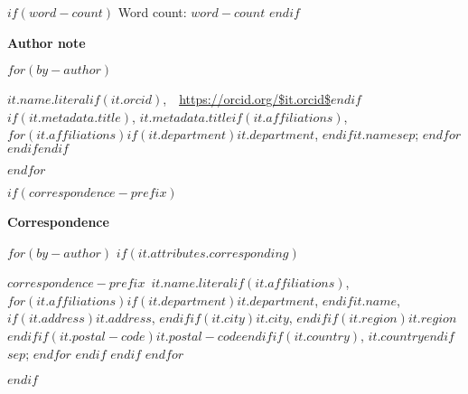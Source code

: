 
\begin{titlepage}
\center

{\let\newpage\relax\maketitle}

\thispagestyle{title}

\vspace{0.25in}

$if(word-count)$
{\center Word count: $word-count$}
$endif$

\vspace{0.5in}

\begin{center}

\textbf{Author note}

$for(by-author)$
\raggedright\setlength{\parindent}{0.5in}$it.name.literal$$if(it.orcid)$,~~\url{https://orcid.org/$it.orcid$}$endif$$if(it.metadata.title)$, $it.metadata.title$$if(it.affiliations)$, $for(it.affiliations)$$if(it.department)$$it.department$, $endif$$it.name$$sep$; $endfor$ $endif$$endif$

$endfor$

\end{center}

$if(correspondence-prefix)$
\begin{center}

\textbf{Correspondence}

$for(by-author)$
$if(it.attributes.corresponding)$
\par\raggedright\setlength{\parindent}{0.5in}$correspondence-prefix$~$it.name.literal$$if(it.affiliations)$, $for(it.affiliations)$$if(it.department)$$it.department$, $endif$$it.name$, $if(it.address)$$it.address$, $endif$$if(it.city)$$it.city$, $endif$$if(it.region)$$it.region$ $endif$$if(it.postal-code)$$it.postal-code$$endif$$if(it.country)$, $it.country$$endif$$sep$; $endfor$ $endif$
$endif$
$endfor$

\end{center}
$endif$


\end{titlepage}
